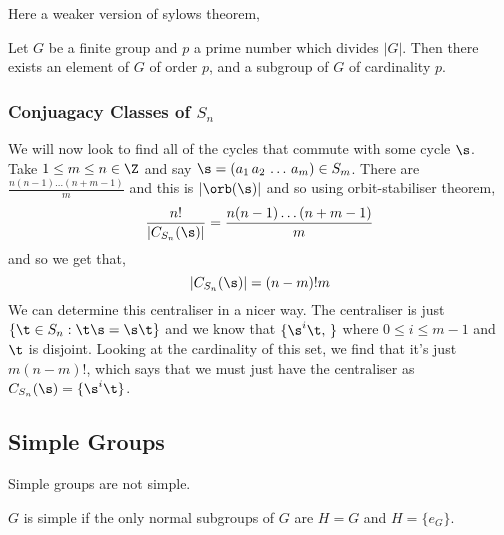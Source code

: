 Here a weaker version of sylows theorem,
\begin{nthm}
  Let $G$ be a finite group and $p$ a prime number which divides $|G|$. Then there exists an element of $G$ of order $p$, and a subgroup of $G$ of cardinality $p$.
\end{nthm}

\subsubsection{Conjuagacy Classes of $S_n$}
We will now look to find all of the cycles that commute with some cycle $\s$.\\

Take $1 \le m \le n \in \Z$ and say $\s = (a_1\,a_2\,\dots\,a_m) \in S_m$. There are $\frac{n(n-1)\dots (n+m-1)}{m}$ and this is $|\orb (\s)|$ and so using orbit-stabiliser theorem,
$$ \frac{n!}{|C_{S_n}(\s)|} = \frac{n(n-1)\dots (n+m-1)}{m} $$
and so we get that,
$$ |C_{S_n}(\s)| = (n-m)!m $$
We can determine this centraliser in a nicer way. The centraliser is just $\{\t\in S_n : \t\s = \s\t\}$ and we know that $\{\s^i\t,\, \}$ where $0 \le i \le m- 1$ and $\t$ is disjoint. Looking at the cardinality of this set, we find that it's just $m(n - m)!$, which says that we must just have the centraliser as $C_{S_n}(\s) = \{\s^i\t\}$.

\subsection{Simple Groups}
\begin{tcolorbox}
  \center Simple groups are not simple.
\end{tcolorbox}

\begin{ndefi}
  $G$ is simple if the only normal subgroups of $G$ are $H = G$ and $H = \{e_G\}$.
\end{ndefi}

